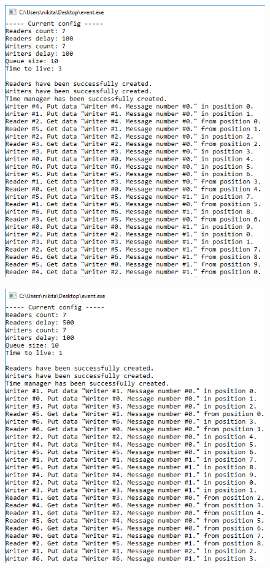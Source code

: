 \documentclass[14pt,a4paper,report]{report}
\begin{document}
\begin{figure}[h!]
	\centering
	\includegraphics[scale = 0.72]{images/p1_5_1.png}
	
	\caption{}
	\label{image:9}
\end{figure}

\begin{figure}[h!]
	\centering
	\includegraphics[scale = 0.72]{images/p1_5_2.png}
	
	\caption{}
	\label{image:10}
\end{figure}
\end{document}
